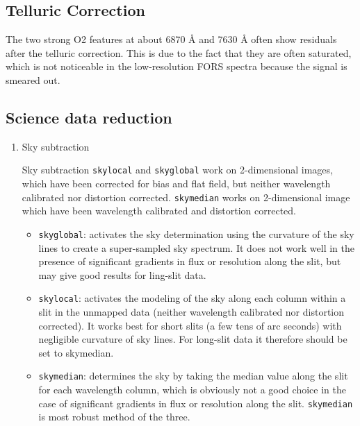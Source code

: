 \subsection{Telluric Correction}

The two strong O2 features at about 6870 Å and 7630 Å often show residuals after the telluric correction. This is due to the fact that they are often saturated, which is not noticeable in the low-resolution FORS spectra because
the signal is smeared out.





\subsection{Science data reduction}

\begin{enumerate}

\item Sky subtraction

Sky subtraction {\tt skylocal} and {\tt skyglobal} work on 2-dimensional images, which have been corrected for bias and flat field, but neither wavelength calibrated nor distortion corrected. {\tt skymedian} works on
2-dimensional image which have been wavelength calibrated and distortion corrected.

\begin{itemize}

\item {\tt skyglobal}: activates the sky determination using the curvature of the sky lines to create a super-sampled sky spectrum. It does not work well in the presence of significant gradients in flux or resolution along the slit, but may give good results for ling-slit data.

\item {\tt skylocal}: activates the modeling of the sky along each column within a slit in the unmapped data (neither wavelength calibrated nor distortion corrected). It works best for short slits (a few tens of arc seconds) with negligible curvature of sky lines. For long-slit data it therefore should be set to skymedian.

\item {\tt skymedian}: determines the sky by taking the median value along the slit for each wavelength column, which is obviously not a good choice in the case of significant gradients in flux or resolution along the slit. {\tt skymedian} is most robust method of the three.


\end{itemize}
\end{enumerate}
